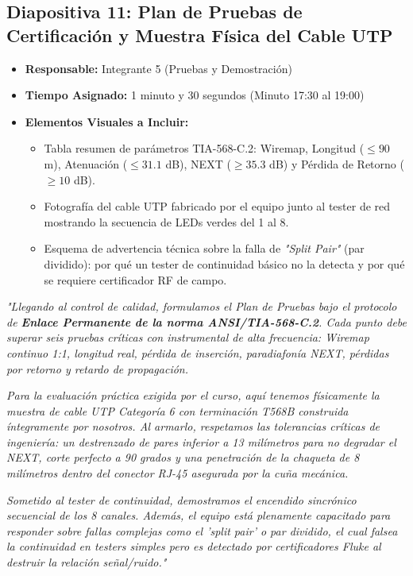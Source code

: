 \documentclass[11pt,a4paper]{article}
\begin{document}
\subsection{Diapositiva 11: Plan de Pruebas de Certificación y Muestra Física del Cable UTP}
\begin{itemize}[leftmargin=*]
    \item \textbf{Responsable:} Integrante 5 (Pruebas y Demostración)
    \item \textbf{Tiempo Asignado:} 1 minuto y 30 segundos (Minuto 17:30 al 19:00)
    \item \textbf{Elementos Visuales a Incluir:}
    \begin{itemize}
        \item Tabla resumen de parámetros TIA-568-C.2: Wiremap, Longitud ($\le 90$ m), Atenuación ($\le 31.1$ dB), NEXT ($\ge 35.3$ dB) y Pérdida de Retorno ($\ge 10$ dB).
        \item Fotografía del cable UTP fabricado por el equipo junto al tester de red mostrando la secuencia de LEDs verdes del 1 al 8.
        \item Esquema de advertencia técnica sobre la falla de \textit{"Split Pair"} (par dividido): por qué un tester de continuidad básico no la detecta y por qué se requiere certificador RF de campo.
    \end{itemize}
\end{itemize}

\begin{tcolorbox}[colback=white,colframe=primaryblue,title=\textbf{Speech Verbal del Integrante 5 (Guion Palabra por Palabra)}]
\textit{"Llegando al control de calidad, formulamos el Plan de Pruebas bajo el protocolo de \textbf{Enlace Permanente de la norma ANSI/TIA-568-C.2}. Cada punto debe superar seis pruebas críticas con instrumental de alta frecuencia: Wiremap continuo 1:1, longitud real, pérdida de inserción, paradiafonía NEXT, pérdidas por retorno y retardo de propagación.}\par\vspace{2mm}
\textit{Para la evaluación práctica exigida por el curso, aquí tenemos físicamente la muestra de cable UTP Categoría 6 con terminación T568B construida íntegramente por nosotros. Al armarlo, respetamos las tolerancias críticas de ingeniería: un destrenzado de pares inferior a 13 milímetros para no degradar el NEXT, corte perfecto a 90 grados y una penetración de la chaqueta de 8 milímetros dentro del conector RJ-45 asegurada por la cuña mecánica.}\par\vspace{2mm}
\textit{Sometido al tester de continuidad, demostramos el encendido sincrónico secuencial de los 8 canales. Además, el equipo está plenamente capacitado para responder sobre fallas complejas como el 'split pair' o par dividido, el cual falsea la continuidad en testers simples pero es detectado por certificadores Fluke al destruir la relación señal/ruido."}
\end{tcolorbox}
\end{document}
